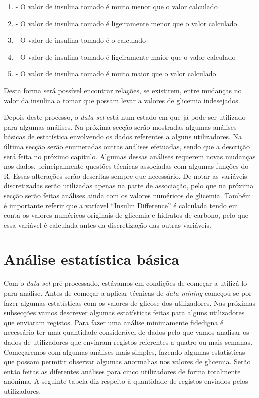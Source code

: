 \begin{enumerate}
\item  - O valor de insulina tomado é muito menor que o valor calculado
\item  - O valor de insulina tomado é ligeiramente menor que o valor calculado
\item  - O valor de insulina tomado é o calculado
\item  - O valor de insulina tomado é ligeiramente maior que o valor calculado
\item  - O valor de insulina tomado é muito maior que o valor calculado
\end{enumerate}
Desta forma será possível encontrar relações, se existirem, entre mudanças no valor da insulina a tomar que possam levar a valores de glicemia indesejados. 


Depois deste processo, o \textit{data set} está num estado em que já pode ser utilizado para algumas análises. Na próxima secção serão mostradas algumas análises básicas de estatística envolvendo os dados referentes a alguns utilizadores. Na última secção serão enumeradas outras análises efetuadas, sendo que a descrição será feita no próximo capítulo. Algumas dessas análises requerem novas mudanças nos dados, principalmente questões técnicas associadas com algumas funções do R. Essas alterações serão descritas sempre que necessário. De notar as variáveis discretizadas serão utilizadas apenas na parte de associação, pelo que na próxima secção serão feitas análises ainda com os valores numéricos de glicemia. Também é importante referir que a varíavel ``Insulin \textunderscore Difference'' é calculada tendo em conta os valores numéricos originais de glicemia e hidratos de carbono, pelo que essa variável é calculada antes da discretização das outras variáveis. 

\section{Análise estatística básica}

Com o \textit{data set} pré-processado, estávamos em condições de começar a utilizá-lo para análise. Antes de começar a aplicar técnicas de \textit{data mining} começou-se por fazer algumas estatísticas com os valores de glicose dos utilizadores. Nas próximas subsecções vamos descrever algumas estatísticas feitas para alguns utilizadores que enviaram registos. Para fazer uma análise minimamente fidedigna é necessário ter uma quantidade considerável de dados pelo que vamos analisar os dados de utilizadores que enviaram registos referentes a quatro ou mais semanas. Começaremos com algumas análises mais simples, fazendo algumas estatísticas que possam permitir observar algumas anormalias nos valores de glicemia. Serão então feitas as diferentes análises para cinco utilizadores de forma totalmente anónima. A seguinte tabela diz respeito à quantidade de registos enviados pelos utilizadores.


